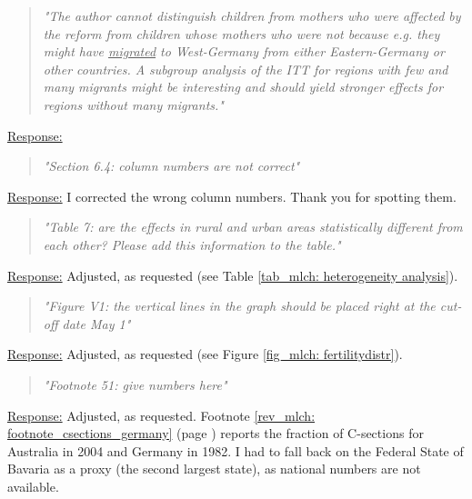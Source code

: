 \begin{quote}
	\textit{"The author cannot distinguish children from mothers who were affected by the reform from children whose mothers who were not because e.g. they might have \underline{migrated} to West-Germany from either Eastern-Germany or other countries. A subgroup analysis of the ITT for regions with few and many migrants might be interesting and should yield stronger effects for regions without many migrants."}
\end{quote}
\underline{Response:}

% 
\begin{quote}
	\textit{"Section 6.4: column numbers are not correct"}
\end{quote}
\underline{Response:} I corrected the wrong column numbers. Thank you for spotting them.

% 
\begin{quote}
	\textit{"Table 7: are the effects in rural and urban areas statistically different from each other? Please add this information to the table."}
\end{quote}
\underline{Response:} Adjusted, as requested (see Table \ref{tab_mlch: heterogeneity analysis}).

% 
\begin{quote}
	\textit{"Figure V1: the vertical lines in the graph should be placed right at the cut-off date May 1"}
\end{quote}
\underline{Response:} Adjusted, as requested (see Figure \ref{fig_mlch: fertilitydistr}).

% 
\begin{quote}
	\textit{"Footnote 51: give numbers here"}
\end{quote}
\underline{Response:} Adjusted, as requested. Footnote \ref{rev_mlch: footnote_csections_germany} (page \pageref{rev_mlch: footnote_csections_germany}) reports the fraction of C-sections for Australia in 2004 and Germany in 1982. I had to fall back on the Federal State of Bavaria as a proxy (the second largest state), as national numbers are not available.











